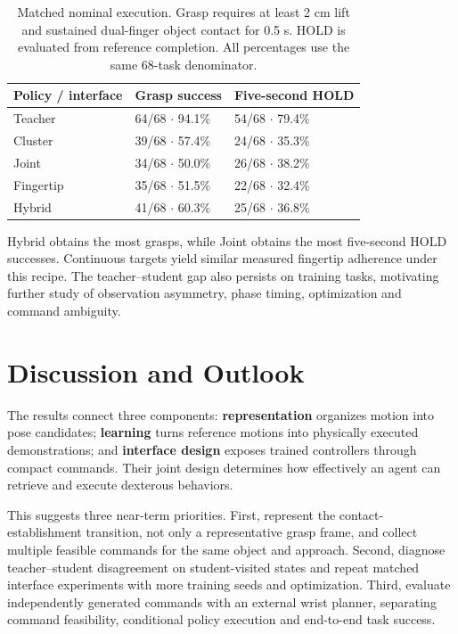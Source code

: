 \documentclass[10pt,twocolumn]{article}
\begin{document}
\begin{table}[t]
\small
\begin{tabularx}{\textwidth}{@{}lXX@{}}
\toprule
Policy / interface & Grasp success & Five-second HOLD \\
\midrule
Teacher & 64/68 $\cdot$ 94.1\% & 54/68 $\cdot$ 79.4\% \\
Cluster & 39/68 $\cdot$ 57.4\% & 24/68 $\cdot$ 35.3\% \\
Joint & 34/68 $\cdot$ 50.0\% & 26/68 $\cdot$ 38.2\% \\
Fingertip & 35/68 $\cdot$ 51.5\% & 22/68 $\cdot$ 32.4\% \\
Hybrid & 41/68 $\cdot$ 60.3\% & 25/68 $\cdot$ 36.8\% \\
\bottomrule
\end{tabularx}
\caption{Matched nominal execution. Grasp requires at least 2 cm lift and sustained dual-finger object contact for 0.5 s. HOLD is evaluated from reference completion. All percentages use the same 68-task denominator.}
\end{table}

Hybrid obtains the most grasps, while Joint obtains the most five-second HOLD successes. Continuous targets yield similar measured fingertip adherence under this recipe. The teacher--student gap also persists on training tasks, motivating further study of observation asymmetry, phase timing, optimization and command ambiguity.

\section{Discussion and Outlook}

The results connect three components: \textbf{representation} organizes motion into pose candidates; \textbf{learning} turns reference motions into physically executed demonstrations; and \textbf{interface design} exposes trained controllers through compact commands. Their joint design determines how effectively an agent can retrieve and execute dexterous behaviors.

This suggests three near-term priorities. First, represent the contact-establishment transition, not only a representative grasp frame, and collect multiple feasible commands for the same object and approach. Second, diagnose teacher--student disagreement on student-visited states and repeat matched interface experiments with more training seeds and optimization. Third, evaluate independently generated commands with an external wrist planner, separating command feasibility, conditional policy execution and end-to-end task success.
\end{document}
